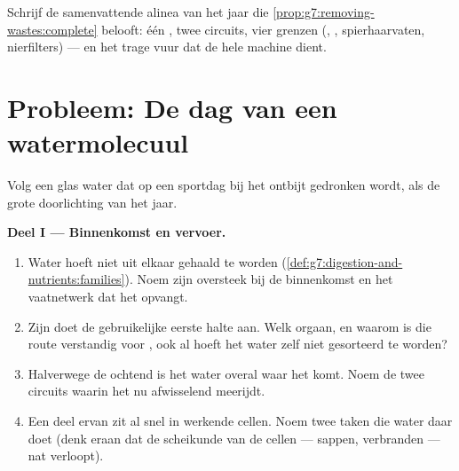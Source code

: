 \begin{exercise}[$\star\star\star$]\label{exo:g7:removing-wastes:12}
Schrijf de samenvattende alinea van het jaar die
\cref{prop:g7:removing-wastes:complete} belooft: één , twee
circuits, vier grenzen (, , spierhaarvaten,
nierfilters) --- en het trage vuur dat de hele machine dient.
\end{exercise}

\section{Probleem: De dag van een watermolecuul}

\begin{problem}\label{pb:g7:removing-wastes:1}
Volg een glas water dat op een sportdag bij het ontbijt gedronken wordt,
als de grote doorlichting van het jaar.

\medskip\noindent\textbf{Deel I --- Binnenkomst en vervoer.}
\begin{enumerate}
  \item Water hoeft niet uit elkaar gehaald te worden
        (\cref{def:g7:digestion-and-nutrients:families}). Noem zijn
        oversteek bij de binnenkomst en het vaatnetwerk dat het opvangt.
  \item Zijn  doet de gebruikelijke eerste halte aan. Welk orgaan, en
        waarom is die route verstandig voor , ook al hoeft
        het water zelf niet gesorteerd te worden?
  \item Halverwege de ochtend is het water overal waar het  komt.
        Noem de twee circuits waarin het nu afwisselend meerijdt.
  \item Een deel ervan zit al snel in werkende cellen. Noem twee taken die
        water daar doet (denk eraan dat de scheikunde van de cellen ---
        sappen, verbranden --- nat verloopt).
\end{enumerate}


\end{problem}

